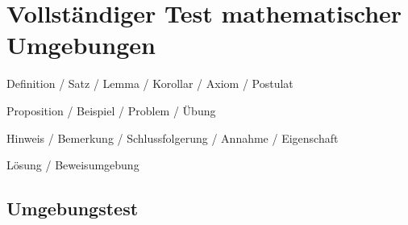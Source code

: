 \documentclass[de]{../../elegantbook}
\begin{document}
\chapter{Vollständiger Test mathematischer Umgebungen}
\begin{introduction}
\item Definition / Satz / Lemma / Korollar / Axiom / Postulat
\item Proposition / Beispiel / Problem / Übung
\item Hinweis / Bemerkung / Schlussfolgerung / Annahme / Eigenschaft
\item Lösung / Beweisumgebung
\end{introduction}

\section{Umgebungstest}
\end{document}

